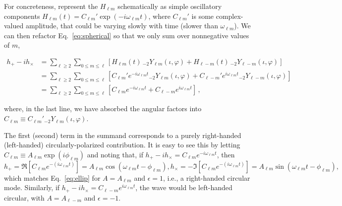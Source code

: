 \documentclass[aps,prd,twocolumn,superscriptaddress,preprintnumbers,floatfix,nofootinbib]{revtex4-2}
\begin{document}
For concreteness, represent the $H_{\ell m}$ schematically as simple oscillatory components $H_{\ell m} (t) = C_{\ell m}' \exp\left(-i \omega_{\ell m} t\right)$, where $C_{\ell m}'$ is some complex-valued amplitude, that could be varying slowly with time (slower than $\omega_{\ell m}$).
We can then refactor Eq.~\eqref{eq:spherical} so that we only sum over nonnegative values of $m$,
\begin{widetext}
\begin{subequations} \label{eq:spherical_modes}
\begin{align}
h_+ - i h_\times &= \sum_{\ell \geq 2} \sum_{0\leq m \leq \ell} \left[H_{\ell m}(t)\, {}_{-2}Y_{\ell m} (\iota, \varphi) + H_{\ell -m}(t)\, {}_{-2}Y_{\ell -m} (\iota, \varphi) \right] \\
&= \sum_{\ell \geq 2} \sum_{0\leq m \leq \ell} \left[C_{\ell m}' e^{-i\omega_{\ell m} t} {}_{-2}Y_{\ell m}(\iota, \varphi) +  C_{\ell -m}' e^{i\omega_{\ell m} t} {}_{-2}Y_{\ell- m}(\iota, \varphi) \right] \\
&= \sum_{\ell \geq 2} \sum_{0\leq m \leq \ell} \left[C_{\ell m} e^{-i\omega_{\ell m} t}  +  C_{\ell -m} e^{i\omega_{\ell m} t} \right]\, ,
\end{align}
\end{subequations}
\end{widetext}
where, in the last line, we have absorbed the angular factors into $C_{\ell m} \equiv C_{\ell m}' {}_{-2}Y_{\ell m} (\iota, \varphi)$.

The first (second) term in the summand corresponds to a purely right-handed (left-handed) circularly-polarized contribution.
It is easy to see this by letting $C_{\ell m} \equiv A_{\ell m} \exp(i \phi_{\ell m})$ and noting that, if $h_+ - i h_\times = C_{\ell m} e^{-i\omega_{\ell m} t}$, then
\begin{subequations}
\begin{equation}
h_+ = \Re \left[ C_{\ell m} e^{-(i\omega_{\ell m} t )} \right] =
A_{\ell m} \cos (\omega_{\ell m} t - \phi_{\ell m}) ,
\end{equation}
\begin{equation}
h_\times = -\Im \left[ C_{\ell m} e^{-(i\omega_{\ell m} t )} \right] =
A_{\ell m} \sin (\omega_{\ell m} t - \phi_{\ell m}) ,
\end{equation}
\end{subequations}
which matches Eq.~\eqref{eq:ellip} for $A = A_{\ell m}$ and $\epsilon = 1$, i.e., a right-handed circular mode.
Similarly, if $h_+ - i h_\times = C_{\ell -m} e^{i\omega_{\ell m} t}$, the wave would be left-handed circular, with $A = A_{\ell -m}$ and $\epsilon = -1$.
\end{document}
